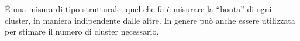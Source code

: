 \documentclass{subfiles}
\begin{document}
\'E una misura di tipo strutturale; quel che fa è misurare la ``bonta'' di ogni cluster, in maniera indipendente dalle altre.
In genere può anche essere utilizzata per stimare il numero di cluster necessario.
\end{document}
